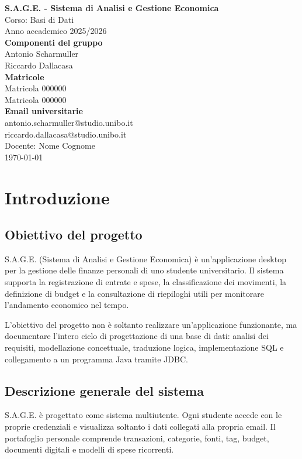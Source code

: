 \documentclass[11pt,a4paper]{article}
\makeatletter
\newcommand{\ProjectTitle}{S.A.G.E. - Sistema di Analisi e Gestione Economica}
\newcommand{\CourseName}{Corso: Basi di Dati}
\newcommand{\AcademicYear}{Anno accademico 2025/2026}
\newcommand{\GroupMembers}{Antonio Scharmuller \\ Riccardo Dallacasa}
\newcommand{\StudentNumbers}{Matricola 000000 \\ Matricola 000000}
\newcommand{\Emails}{antonio.scharmuller@studio.unibo.it \\ riccardo.dallacasa@studio.unibo.it}
\newcommand{\Supervisor}{Docente: Nome Cognome}
\newcommand{\UniversityLogo}{logo-unibo.png}
\makeatother
\begin{document}
\hypersetup{pageanchor=false}
\begin{titlepage}
    \centering
    \vspace*{1.5cm}
    {\Huge\bfseries \ProjectTitle \\[1.5em]}
    \vfill
    {\Large \CourseName \\}
    {\Large \AcademicYear \\}
    \vspace{1.5cm}
    {\large\bfseries Componenti del gruppo}\\
    \GroupMembers\\[1em]
    {\large\bfseries Matricole}\\
    \StudentNumbers\\[1em]
    {\large\bfseries Email universitarie}\\
    \Emails\\[1.5em]
    {\large \Supervisor}\\[2em]
    \vfill
    {\large \today}
\end{titlepage}

\clearpage
\hypersetup{pageanchor=true}
\tableofcontents
\newpage
{}

\section{Introduzione}
\subsection{Obiettivo del progetto}
S.A.G.E. (Sistema di Analisi e Gestione Economica) è un'applicazione desktop per la gestione delle finanze personali di uno studente universitario. Il sistema supporta la registrazione di entrate e spese, la classificazione dei movimenti, la definizione di budget e la consultazione di riepiloghi utili per monitorare l'andamento economico nel tempo.

L'obiettivo del progetto non è soltanto realizzare un'applicazione funzionante, ma documentare l'intero ciclo di progettazione di una base di dati: analisi dei requisiti, modellazione concettuale, traduzione logica, implementazione SQL e collegamento a un programma Java tramite JDBC.

\subsection{Descrizione generale del sistema}
S.A.G.E. è progettato come sistema multiutente. Ogni studente accede con le proprie credenziali e visualizza soltanto i dati collegati alla propria email. Il portafoglio personale comprende transazioni, categorie, fonti, tag, budget, documenti digitali e modelli di spese ricorrenti.
\end{document}
